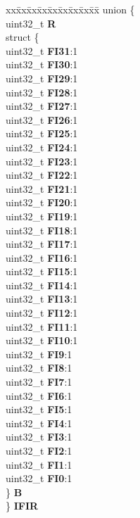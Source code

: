 \begin{DoxyCompactItemize}
\begin{tabbing}
\end{tabbing}\item 
\mbox{\label{structSIU__tag_ac51d4cbac864def75f19971e2ede6e98}} 
\begin{tabbing}
xx\=xx\=xx\=xx\=xx\=xx\=xx\=xx\=xx\=\kill
union \{\\
\>uint32\_t {\bfseries R}\\
\>struct \{\\
\>\>uint32\_t {\bfseries FI31}:1\\
\>\>uint32\_t {\bfseries FI30}:1\\
\>\>uint32\_t {\bfseries FI29}:1\\
\>\>uint32\_t {\bfseries FI28}:1\\
\>\>uint32\_t {\bfseries FI27}:1\\
\>\>uint32\_t {\bfseries FI26}:1\\
\>\>uint32\_t {\bfseries FI25}:1\\
\>\>uint32\_t {\bfseries FI24}:1\\
\>\>uint32\_t {\bfseries FI23}:1\\
\>\>uint32\_t {\bfseries FI22}:1\\
\>\>uint32\_t {\bfseries FI21}:1\\
\>\>uint32\_t {\bfseries FI20}:1\\
\>\>uint32\_t {\bfseries FI19}:1\\
\>\>uint32\_t {\bfseries FI18}:1\\
\>\>uint32\_t {\bfseries FI17}:1\\
\>\>uint32\_t {\bfseries FI16}:1\\
\>\>uint32\_t {\bfseries FI15}:1\\
\>\>uint32\_t {\bfseries FI14}:1\\
\>\>uint32\_t {\bfseries FI13}:1\\
\>\>uint32\_t {\bfseries FI12}:1\\
\>\>uint32\_t {\bfseries FI11}:1\\
\>\>uint32\_t {\bfseries FI10}:1\\
\>\>uint32\_t {\bfseries FI9}:1\\
\>\>uint32\_t {\bfseries FI8}:1\\
\>\>uint32\_t {\bfseries FI7}:1\\
\>\>uint32\_t {\bfseries FI6}:1\\
\>\>uint32\_t {\bfseries FI5}:1\\
\>\>uint32\_t {\bfseries FI4}:1\\
\>\>uint32\_t {\bfseries FI3}:1\\
\>\>uint32\_t {\bfseries FI2}:1\\
\>\>uint32\_t {\bfseries FI1}:1\\
\>\>uint32\_t {\bfseries FI0}:1\\
\>\} {\bfseries B}\\
\} {\bfseries IFIR}\\


\end{tabbing}
\end{DoxyCompactItemize}
